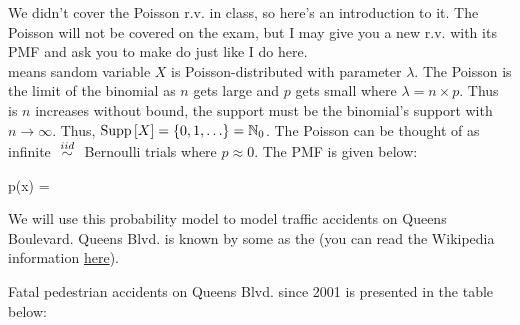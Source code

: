 \documentclass[12pt]{article}
\newcommand{\spc}[1]{\iftoggle{spacingmode}{\\ \vspace{#1cm}}}
\begin{document}


\problem We didn't cover the Poisson r.v. in class, so here's an introduction to it. The Poisson will not be covered on the exam, but I may give you a new r.v. with its PMF and ask you to make do just like I do here. \\

 means sandom variable $X$ is Poisson-distributed with parameter $\lambda$. The Poisson is the limit of the binomial as $n$ gets large and $p$ gets small where $\lambda = n \times p$. Thus is $n$ increases without bound, the support must be the binomial's support with $n \rightarrow \infty$. Thus, $\text{Supp}\left[X\right] = \left\{0, 1, \ldots\right\} = \mathbb{N}_0$. The Poisson can be thought of as infinite $\iid$ Bernoulli trials where $p \approx 0$. The PMF is given below:

\beqn
p(x) = 
\eeqn

We will use this probability model to model traffic accidents on Queens Boulevard. Queens Blvd. is known by some as the  (you can read the Wikipedia information \href{http://en.wikipedia.org/wiki/Queens_Boulevard#Boulevard_of_Death}{here}). 



Fatal pedestrian accidents on Queens Blvd. since 2001 is presented in the table below:
\end{document}
